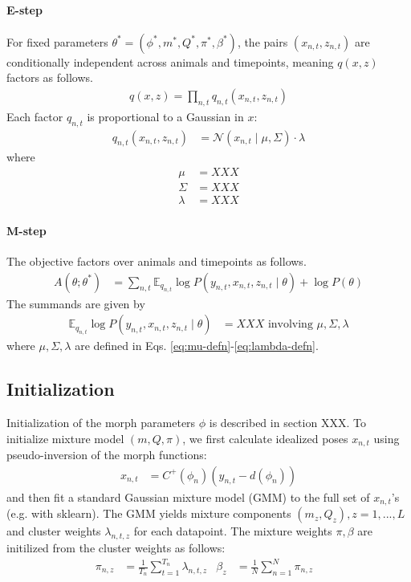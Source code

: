 \documentclass{article}         %
\newcommand{\EE}{\mathbb{E}}
\newcommand{\NN}{\mathcal{N}}
\begin{document}
\paragraph{E-step} For fixed parameters $\theta^* = (\phi^*, m^*, Q^*, \pi^*, \beta^*)$, the pairs $(x_{n,t}, z_{n,t})$ are conditionally independent across animals and timepoints, meaning $q(x, z)$ factors as follows.
\begin{align}
    q(x, z) = \prod_{n,t} q_{n,t}(x_{n,t}, z_{n,t})
\end{align}
Each factor $q_{n,t}$ is proportional to a Gaussian in $x$:
\begin{align}
    q_{n,t}(x_{n,t}, z_{n,t}) & = \NN(x_{n,t} \mid \mu, \Sigma) \cdot \lambda
\end{align}
where
\begin{align}
    \mu & = XXX \label{eq:mu-defn} \\
    \Sigma & = XXX \label{eq:Sigma-defn} \\
    \lambda & = XXX \label{eq:lambda-defn}
\end{align}

\paragraph{M-step} The objective factors over animals and timepoints as follows.
\begin{align}
    A(\theta; \theta^*) & = \sum_{n,t} \EE_{q_{n,t}} \log P(y_{n,t}, x_{n,t}, z_{n,t} \mid \theta) + \log P(\theta)
\end{align}
The summands are given by
\begin{align}
    \EE_{q_{n,t}} \log P(y_{n,t}, x_{n,t}, z_{n,t} \mid \theta) & = XXX \text{ involving } \mu, \Sigma, \lambda \label{eq:summand}
\end{align}
where $\mu, \Sigma, \lambda$ are defined in Eqs. \ref{eq:mu-defn}-\ref{eq:lambda-defn}. 

\subsection{Initialization}
Initialization of the morph parameters $\phi$ is described in section XXX. To initialize mixture model $(m, Q, \pi)$, we first calculate idealized poses $x_{n,t}$ using pseudo-inversion of the morph functions:
\begin{align}
    x_{n,t} & = C^+(\phi_n)(y_{n,t} - d(\phi_n))
\end{align}
and then fit a standard Gaussian mixture model (GMM) to the full set of $x_{n,t}$'s (e.g. with sklearn). The GMM yields mixture components $(m_z, Q_z), z=1,...,L$ and cluster weights $\lambda_{n,t,z}$ for each datapoint. The mixture weights $\pi, \beta$ are initilized from the cluster weights as follows:
\begin{align}
    \pi_{n,z} & = \frac{1}{T_n} \sum_{t=1}^{T_n} \lambda_{n,t,z} &
    \beta_z & = \frac{1}{N} \sum_{n=1}^N \pi_{n,z} &
\end{align}
\end{document}
